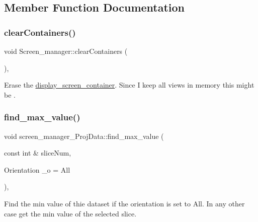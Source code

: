 \subsection{Member Function Documentation}
\mbox{\label{classScreen__manager_a5896c354d45b0b4142a76b26f7081787}} 
\subsubsection{\texorpdfstring{clear\+Containers()}{clearContainers()}}
{\footnotesize\ttfamily void Screen\+\_\+manager\+::clear\+Containers (\begin{DoxyParamCaption}{ }\end{DoxyParamCaption})\hspace{0.3cm}{\ttfamily [protected]}, {\ttfamily [inherited]}}

Erase the \mbox{\hyperlink{classdisplay__screen__container}{display\+\_\+screen\+\_\+container}}. Since I keep all views in memory this might be . \mbox{\label{classscreen__manager__ProjData_a665de828d1b1761f94a07ad63ecdf75f}} 
\subsubsection{\texorpdfstring{find\+\_\+max\+\_\+value()}{find\_max\_value()}}
{\footnotesize\ttfamily void screen\+\_\+manager\+\_\+\+Proj\+Data\+::find\+\_\+max\+\_\+value (\begin{DoxyParamCaption}\item[{const int \&}]{slice\+Num,  }\item[{Orientation}]{\+\_\+o = {\ttfamily All} }\end{DoxyParamCaption})\hspace{0.3cm}{\ttfamily [protected]}, {\ttfamily [virtual]}}

Find the min value of thie dataset if the orientation is set to All. In any other case get the min value of the selected slice. 

